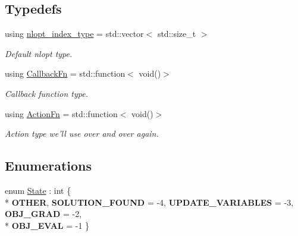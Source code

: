 \subsection*{Typedefs}
\begin{DoxyCompactItemize}
\item 
\hypertarget{namespaceop_a10f2d92550b5ec0c77b7a4fc5cd2d6b0}{using \hyperlink{namespaceop_a10f2d92550b5ec0c77b7a4fc5cd2d6b0}{nlopt\-\_\-index\-\_\-type} = std\-::vector$<$ std\-::size\-\_\-t $>$}\label{namespaceop_a10f2d92550b5ec0c77b7a4fc5cd2d6b0}

\begin{DoxyCompactList}\small\item\em Default nlopt type. \end{DoxyCompactList}\item 
\hypertarget{namespaceop_aa384cc9d57783c0a83be03e0fcbab4f4}{using \hyperlink{namespaceop_aa384cc9d57783c0a83be03e0fcbab4f4}{Callback\-Fn} = std\-::function$<$ void()$>$}\label{namespaceop_aa384cc9d57783c0a83be03e0fcbab4f4}

\begin{DoxyCompactList}\small\item\em Callback function type. \end{DoxyCompactList}\item 
\hypertarget{namespaceop_af8b17abb60b9f5c60c0a6764d5aa1228}{using \hyperlink{namespaceop_af8b17abb60b9f5c60c0a6764d5aa1228}{Action\-Fn} = std\-::function$<$ void()$>$}\label{namespaceop_af8b17abb60b9f5c60c0a6764d5aa1228}

\begin{DoxyCompactList}\small\item\em Action type we'll use over and over again. \end{DoxyCompactList}\end{DoxyCompactItemize}
\subsection*{Enumerations}
\begin{DoxyCompactItemize}
\item 
enum \hyperlink{namespaceop_a17ce672f31e786a401a2a25a8308c326}{State} \-: int \{ \\*
{\bfseries O\-T\-H\-E\-R}, 
{\bfseries S\-O\-L\-U\-T\-I\-O\-N\-\_\-\-F\-O\-U\-N\-D} = -\/4, 
{\bfseries U\-P\-D\-A\-T\-E\-\_\-\-V\-A\-R\-I\-A\-B\-L\-E\-S} = -\/3, 
{\bfseries O\-B\-J\-\_\-\-G\-R\-A\-D} = -\/2, 
\\*
{\bfseries O\-B\-J\-\_\-\-E\-V\-A\-L} = -\/1
 \}
\end{DoxyCompactItemize}
